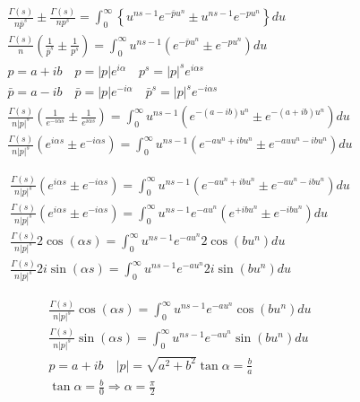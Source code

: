 	$$
	\begin{gathered}
		\frac{\Gamma(s)}{n \bar{p}^s} \pm \frac{\Gamma(s)}{n p^s}=\int_0^{\infty}\left\{u^{n s-1} e^{-\bar{p} u^n} \pm u^{n s-1} e^{-p u^n}\right\} d u \\
		\frac{\Gamma(s)}{n}\left(\frac{1}{\bar{p}^s} \pm \frac{1}{p^s}\right)=\int_0^{\infty} u^{n s-1}\left(e^{-\bar{p} u^n} \pm e^{-p u^n}\right) d u \\
		p=a+i b \quad p=|p| e^{i \alpha} \quad p^s=|p|^s e^{i \alpha s} \\
		\bar{p}=a-i b \quad \bar{p}=|p| e^{-i \alpha} \quad \bar{p}^s=|p|^s e^{-i \alpha s} \\
		\frac{\Gamma(s)}{n|p|^s}\left(\frac{1}{e^{-i \alpha s}} \pm \frac{1}{e^{i \alpha s}}\right)=\int_0^{\infty} u^{n s-1}\left(e^{-(a-i b) u^n} \pm e^{-(a+i b) u^n}\right) d u \\
		\frac{\Gamma(s)}{n|p|^s}\left(e^{i \alpha s} \pm e^{-i \alpha s}\right)=\int_0^{\infty} u^{n s-1}\left(e^{-a u^n+i b u^n} \pm e^{-a u u^n-i b u^n}\right) d u
	\end{gathered}
	$$
	
	$$
	\begin{gathered}
		\frac{\Gamma(s)}{n|p|^s}\left(e^{i \alpha s} \pm e^{-i \alpha s}\right)=\int_0^{\infty} u^{n s-1}\left(e^{-a u^n+i b u^n} \pm e^{-a u^n-i b u^n}\right) d u \\
		\frac{\Gamma(s)}{n|p|^s}\left(e^{i \alpha s} \pm e^{-i \alpha s}\right)=\int_0^{\infty} u^{n s-1} e^{-a u^n}\left(e^{+i b u^n} \pm e^{-i b u^n}\right) d u \\
		\frac{\Gamma(s)}{n|p|^s} 2 \cos (\alpha s)=\int_0^{\infty} u^{n s-1} e^{-a u^n} 2 \cos \left(b u^n\right) d u \\
		\frac{\Gamma(s)}{n|p|^s} 2 i \sin (\alpha s)=\int_0^{\infty} u^{n s-1} e^{-a u^n} 2 i \sin \left(b u^n\right) d u
	\end{gathered}
	$$
	
	$$
	\begin{gathered}
		\frac{\Gamma(s)}{n|p|^s} \cos (\alpha s)=\int_0^{\infty} u^{n s-1} e^{-a u^n} \cos \left(b u^n\right) d u \\
		\frac{\Gamma(s)}{n|p|^s} \sin (\alpha s)=\int_0^{\infty} u^{n s-1} e^{-a u^n} \sin \left(b u^n\right) d u \\
		p=a+i b \quad|p|=\sqrt{a^2+b^2} \tan \alpha=\frac{b}{a} \\
		\tan \alpha=\frac{b}{0} \Rightarrow \alpha=\frac{\pi}{2}
	\end{gathered}
	$$
	
